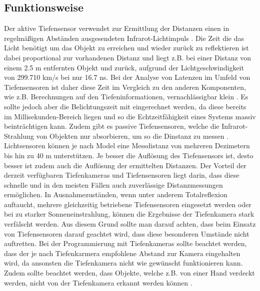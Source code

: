 \subsection{Funktionsweise}
Der aktive Tiefensensor verwendet zur Ermittlung der Distanzen einen in regelmäßigen Abständen ausgesendeten Infrarot-Lichtimpuls \cite{understanding_infrared_sensors_nodate}. Die Zeit die das Licht benötigt um das Objekt zu erreichen und wieder zurück zu reflektieren ist dabei proportional zur vorhandenen Distanz und liegt z.B. bei einer Distanz von einem \num{2,5} m entfernten Objekt und zurück, aufgrund der Lichtgeschwindigkeit von \num{299,710} km/s bei nur \num{16,7} ns. Bei der Analyse von Latenzen im Umfeld von Tiefensensoren ist daher diese Zeit im Vergleich zu den anderen Komponenten, wie z.B. Berechnungen auf den Tiefeninformationen, vernachlässigbar klein \cite{tof-kamera_2019}. Es sollte jedoch aber die Belichtungszeit mit eingerechnet werden, da diese bereits im Millisekunden-Bereich liegen und so die Echtzeitfähigkeit eines Systems massiv beinträchtigen kann. Zudem gibt es passive Tiefensensoren, welche die Infrarot-Strahlung von Objekten nur absorbieren, um so die Dinstanz zu messen \cite{understanding_infrared_sensors_nodate}. Lichtsensoren können je nach Model eine Messdistanz von mehreren Dezimetern bis hin zu 40 m unterstützen. Je besser die Auflösung des Tiefensensors ist, desto besser ist zudem auch die Auflösung der ermittelten Distanzen. Der Vorteil der derzeit verfügbaren Tiefenkameras und Tiefensensoren liegt darin, dass diese schnelle und in den meisten Fällen auch zuverlässige Distanzmessungen ermöglichen. In Ausnahmezuständen, wenn unter anderem Totalreflexion auftaucht, mehrere gleichzeitig betriebene Tiefensensoren eingesetzt werden oder bei zu starker Sonneneinstrahlung, können die Ergebnisse der Tiefenkamera stark verfälscht werden. Aus diesem Grund sollte man darauf achten, dass beim Einsatz von Tiefensensoren darauf geachtet wird, dass diese besonderen Umstände nicht auftretten. Bei der Programmierung mit Tiefenkameras sollte beachtet werden, dass der je nach Tiefenkarmera empfohlene Abstand zur Kamera eingehalten wird, da ansonsten die Tiefenkamera nicht wie gewünscht funktionieren kann. Zudem sollte beachtet werden, dass Objekte, welche z.B. von einer Hand verdeckt werden, nicht von der Tiefenkamera erkannt werden können \cite{tof-kamera_2019}.

